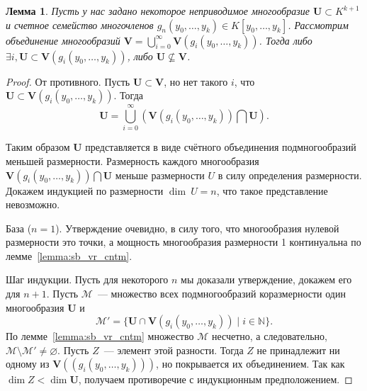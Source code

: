 \documentclass[16pt]{article}
\theoremstyle{plain1}
\newtheorem{lemma}[theorem1]{Лемма}
\theoremstyle{plain2}
\theoremstyle{plain}
\theoremstyle{plain3}
\theoremstyle{definition}
\theoremstyle{remark}
\begin{document}
\begin{lemma} \label{lemma:o vlojenii}
Пусть у нас задано некоторое неприводимое многообразие
$\mathbf{U}\subset K^{k+1}$ и счетное семейство многочленов
$g_n(y_0,\ldots, y_k)\in K[y_0,\ldots, y_k ]$. Рассмотрим объединение
многообразий $\mathbf{V}=\bigcup\limits
_{i=0}^{\infty}\mathbf{V}(g_i(y_0,\ldots, y_k))$. Тогда либо
$\exists i, \mathbf{U} \subset \mathbf{V}(g_i(y_0,\ldots, y_k))$, либо
$\mathbf{U}\nsubseteq \mathbf{V}$.
\end{lemma}

\begin{proof}
От противного. Пусть $\mathbf{U}\subset \mathbf{V}$, но нет такого
$i$, что $\mathbf{U} \subset \mathbf{V}(g_i(y_0,\ldots, y_k))$.
Тогда
$$
\mathbf{U}=\bigcup\limits_{i=0}^{\infty}(\mathbf{V}(g_i(y_0,\ldots,
y_k))\bigcap \mathbf{U}).
$$

Таким образом $\mathbf{U}$ представляется в виде счётного объединения
подмногообразий меньшей размерности. Размерность каждого многообразия
$\mathbf{V}(g_i(y_0,\ldots, y_k))\bigcap \mathbf{U}$ меньше
размерности $U$ в силу определения размерности. Докажем индукцией
по размерности $\dim~U=n$,
что такое представление невозможно.

База ($n=1$). Утверждение очевидно, в силу того, что многообразия
нулевой размерности это точки, а мощность многообразия
размерности 1 континуальна по лемме~\ref{lemma:sb_vr_cntm}.

Шаг индукции. Пусть для некоторого $n$ мы доказали утверждение, докажем его для $n+1$.
Пусть $\mathcal M$~--- множество всех подмногообразий коразмерности
один многообразия $\mathbf{U}$ и
$$
\mathcal M' = \{ \mathbf{U}\cap \mathbf{V}(g_i(y_0,\ldots,y_k))\mid
i\in \mathbb N \}.
$$
По лемме~\ref{lemma:sb_vr_cntm} множество $\mathcal M$ несчетно, а
следовательно, $\mathcal M\setminus\mathcal M'\neq \varnothing$.
Пусть $Z$~--- элемент этой разности. Тогда $Z$ не принадлежит ни
одному из $\mathbf{V}((g_i(y_0,\ldots,y_k)))$, но покрывается их
объединением. Так как $\dim Z<\dim \mathbf{U}$, получаем
противоречие с индукционным предположением.
\end{proof}
\end{document}
